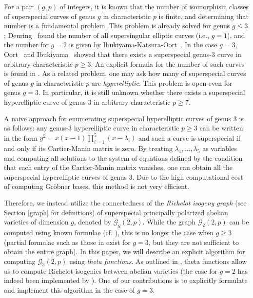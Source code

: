 \documentclass{amsart}
\theoremstyle{definition}
\theoremstyle{plain}
\begin{document}
For a pair $(g,p)$ of integers, it is known that the number of isomorphism classes of superspecial curves of genus $g$ in characteristic $p$ is finite, and determining that number is a fundamental problem.
This problem is already solved for genus $g \leq 3$; Deuring~\cite{Deuring} found the number of all supersingular elliptic curves (i.e., $g=1$), and the number for $g=2$ is {given} by Ibukiyama-Katsura-Oort~\cite{IKO}.
In the case $g=3$, Oort~\cite{Oort} and Ibukiyama~\cite{Ibukiyama} showed that there exists a superspecial genus-3 curve in arbitrary characteristic $p \geq 3$.
An explicit formula for the number of such curves is found in \cite[Theorem 3.10(d)]{Brock}.
As {a related problem}, one may ask how many of superspecial curves of genus-$g$ in characteristic $p$ are \emph{hyperelliptic}.
This problem is open even for genus $g=3$.
In particular, it is still unknown whether there exists a superspecial hyperelliptic curve of genus 3 in arbitrary characteristic $p \geq 7$.

A naive approach for enumerating superspecial hyperelliptic curves of genus 3 is as follows: any genus-3 hyperelliptic curve in characteristic $p \geq 3$ can be written in the form $y^2 = x(x-1)\prod_{i=1}^5(x-\lambda_i)$ and such a curve is superspecial if and only if its Cartier-Manin matrix is zero.
By treating $\lambda_1,\ldots,\lambda_5$ as variables and computing all solutions to the system of equations defined by the condition that each entry of the Cartier-Manin matrix vanishes, one can obtain all the superspecial hyperelliptic curves of genus 3.
Due to the high computational cost of computing Gröbner bases, this method is not very efficient. 

Therefore, we instead utilize the connectedness of the \emph{Richelot isogeny graph} (see Section \ref{graph} for definitions) of superspecial principally polarized abelian varieties of dimension $g$, denoted by $\mathcal{G}_g(2,p)$.
While the graph $\mathcal{G}_2(2,p)$ can be computed using known formulae (cf. \cite[$\S 3$]{CDS}), this is no longer the case when $g \geq 3$ (partial formulae such as those in \cite{Smith2} exist for $g=3$, but they are not sufficient to obtain the entire graph).
In this paper, we will describe an explicit algorithm for computing $\mathcal{G}_3(2,p)$ using \emph{theta functions}.
As outlined in \cite[Appendix F]{SQIsignHD}, theta functions allow us to compute Richelot isogenies between abelian varieties (the case for $g=2$ has indeed been implemented by \cite{DMPR}).
One of our contributions is to explicitly formulate and implement this algorithm in the case of $g=3$.
\end{document}

